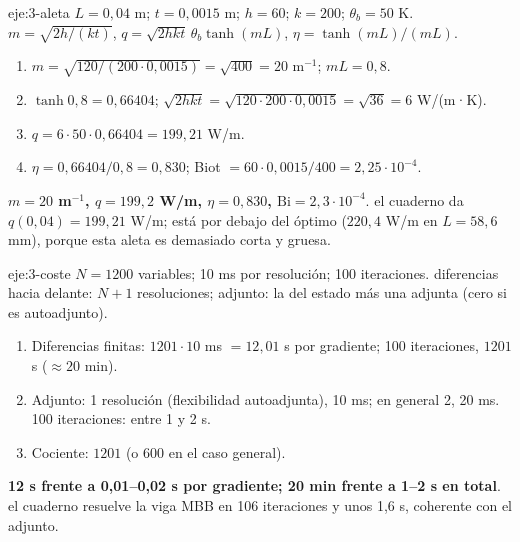 \begin{solucion}{eje:3-aleta}
\datos $L=0{,}04$ m; $t=0{,}0015$ m; $h=60$; $k=200$; $\theta_b=50$ K.
\planteamiento $m=\sqrt{2h/(kt)}$, $q=\sqrt{2hkt}\,\theta_b\tanh(mL)$, $\eta=\tanh(mL)/(mL)$.
\pasos
\begin{enumerate}[label=\arabic*.]
  \item $m=\sqrt{120/(200\cdot 0{,}0015)}=\sqrt{400}=20$ m$^{-1}$; $mL=0{,}8$.
  \item $\tanh 0{,}8=0{,}66404$; $\sqrt{2hkt}=\sqrt{120\cdot 200\cdot 0{,}0015}=\sqrt{36}=6$ W/(m·K).
  \item $q=6\cdot 50\cdot 0{,}66404=199{,}21$ W/m.
  \item $\eta=0{,}66404/0{,}8=0{,}830$; Biot $=60\cdot 0{,}0015/400=2{,}25\cdot 10^{-4}$.
\end{enumerate}
\resultado \textbf{$m=20$ m$^{-1}$, $q=199{,}2$ W/m, $\eta=0{,}830$, $\mathrm{Bi}=2{,}3\cdot 10^{-4}$}.
\comprobacion el cuaderno da $q(0{,}04)=199{,}21$ W/m; está por debajo del óptimo ($220{,}4$ W/m en $L=58{,}6$ mm), porque esta aleta es demasiado corta y gruesa.
\end{solucion}

\begin{solucion}{eje:3-coste}
\datos $N=1200$ variables; 10 ms por resolución; 100 iteraciones.
\planteamiento diferencias hacia delante: $N+1$ resoluciones; adjunto: la del estado más una adjunta (cero si es autoadjunto).
\pasos
\begin{enumerate}[label=\arabic*.]
  \item Diferencias finitas: $1201\cdot 10$ ms $=12{,}01$ s por gradiente; 100 iteraciones, $1201$ s ($\approx 20$ min).
  \item Adjunto: 1 resolución (flexibilidad autoadjunta), 10 ms; en general 2, 20 ms. 100 iteraciones: entre 1 y 2 s.
  \item Cociente: $1201$ (o $600$ en el caso general).
\end{enumerate}
\resultado \textbf{12 s frente a 0,01--0,02 s por gradiente; 20 min frente a 1--2 s en total}.
\comprobacion el cuaderno resuelve la viga MBB en 106 iteraciones y unos 1,6 s, coherente con el adjunto.
\end{solucion}

